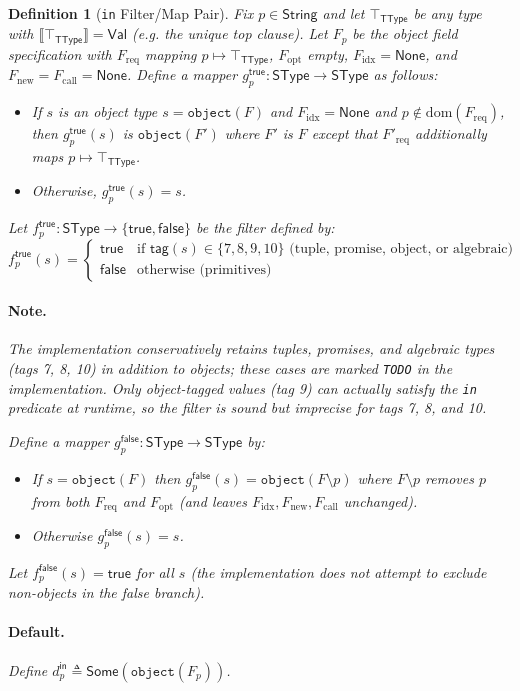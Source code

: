 \documentclass[11pt]{article}
\newtheorem{definition}[theorem]{Definition}
\newcommand{\sem}[1]{\llbracket #1 \rrbracket}
\newcommand{\String}{\mathsf{String}}
\newcommand{\SType}{\mathsf{SType}}
\newcommand{\TType}{\mathsf{TType}}
\newcommand{\tagfn}{\mathsf{tag}}
\newcommand{\Val}{\mathsf{Val}}
\begin{document}
\begin{definition}[\texttt{in} Filter/Map Pair]
\label{def:in-filter-map}
Fix $p \in \String$ and let $\top_{\TType}$ be any type with $\sem{\top_{\TType}}=\Val$ (e.g. the unique top clause).
Let $F_p$ be the object field specification with $F_{\mathrm{req}}$ mapping $p \mapsto \top_{\TType}$, $F_{\mathrm{opt}}$ empty, $F_{\mathrm{idx}}=\mathsf{None}$, and $F_{\mathrm{new}}=F_{\mathrm{call}}=\mathsf{None}$.
Define a mapper $g^{\mathsf{true}}_p : \SType \to \SType$ as follows:
\begin{itemize}
\item If $s$ is an object type $s=\texttt{object}(F)$ and $F_{\mathrm{idx}}=\mathsf{None}$ and $p \notin \mathrm{dom}(F_{\mathrm{req}})$, then $g^{\mathsf{true}}_p(s)$ is $\texttt{object}(F')$ where $F'$ is $F$ except that $F'_{\mathrm{req}}$ additionally maps $p \mapsto \top_{\TType}$.
\item Otherwise, $g^{\mathsf{true}}_p(s)=s$.
\end{itemize}
Let $f^{\mathsf{true}}_p : \SType \to \{\mathsf{true},\mathsf{false}\}$ be the filter defined by:
\[
f^{\mathsf{true}}_p(s) = 
\begin{cases}
\mathsf{true} & \text{if } \tagfn(s) \in \{7,8,9,10\} \text{ (tuple, promise, object, or algebraic)} \\
\mathsf{false} & \text{otherwise (primitives)}
\end{cases}
\]
\paragraph{Note.}
The implementation conservatively retains tuples, promises, and algebraic types (tags 7, 8, 10) in addition to objects; these cases are marked \texttt{TODO} in the implementation.
Only object-tagged values (tag 9) can actually satisfy the \texttt{in} predicate at runtime, so the filter is sound but imprecise for tags 7, 8, and 10.

Define a mapper $g^{\mathsf{false}}_p : \SType \to \SType$ by:
\begin{itemize}
\item If $s=\texttt{object}(F)$ then $g^{\mathsf{false}}_p(s)=\texttt{object}(F\setminus p)$ where $F\setminus p$ removes $p$ from both $F_{\mathrm{req}}$ and $F_{\mathrm{opt}}$ (and leaves $F_{\mathrm{idx}},F_{\mathrm{new}},F_{\mathrm{call}}$ unchanged).
\item Otherwise $g^{\mathsf{false}}_p(s)=s$.
\end{itemize}
Let $f^{\mathsf{false}}_p(s)=\mathsf{true}$ for all $s$ (the implementation does not attempt to exclude non-objects in the false branch).
\paragraph{Default.}
Define $d^{\mathsf{in}}_p \triangleq \mathsf{Some}(\texttt{object}(F_p))$.
\end{definition}
\end{document}
